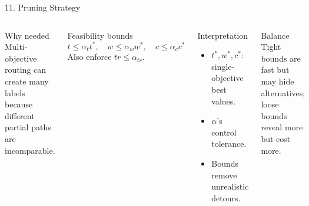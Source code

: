 \documentclass[aspectratio=169]{beamer}
\begin{document}
\begin{frame}{11. Pruning Strategy}
    \begin{columns}[T]
        \begin{block}{Why needed}
            Multi-objective routing can create many labels because different partial paths are incomparable.
        \end{block}

        \begin{block}{Feasibility bounds}
            \[
                t \le \alpha_t t^*,
                \quad
                w \le \alpha_w w^*,
                \quad
                c \le \alpha_c c^*
            \]
            Also enforce \(tr \le \alpha_{tr}\).
        \end{block}

        \begin{block}{Interpretation}
            \begin{itemize}
                \item \(t^*, w^*, c^*\): single-objective best values.
                \item \(\alpha\)'s control tolerance.
                \item Bounds remove unrealistic detours.
            \end{itemize}
        \end{block}

        \begin{alertblock}{Balance}
            Tight bounds are fast but may hide alternatives; loose bounds reveal more but cost more.
        \end{alertblock}
    \end{columns}
\end{frame}
\end{document}

